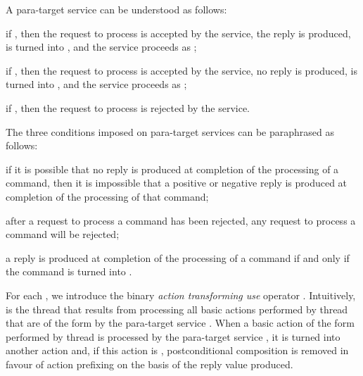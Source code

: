 \documentclass[fleqn]{llncs}
\begin{document}
A para-target service  can be understood as follows:
\begin{iteml}
\item
if , then the request to
process  is accepted by the service, the reply 
is produced,  is turned into , and the service proceeds as
;
\item
if , then the request to process  is
accepted by the service, no reply is produced,  is turned into
, and the service proceeds as ;
\item
if , then the request to process  is
rejected by the service.
\end{iteml}
The three conditions imposed on para-target services can be paraphrased
as follows:
\begin{iteml}
\item
if it is possible that no reply is produced at completion of the
processing of a command, then it is impossible that a positive or
negative reply is produced at completion of the processing of that
command;
\item
after a request to process a command has been rejected, any request to
process a command will be rejected;
\item
a reply is produced at completion of the processing of a command if and
only if the command is turned into .
\end{iteml}

For each , we introduce the binary
\emph{action transforming use} operator
.
Intuitively,  is the thread that results from processing
all basic actions performed by thread  that are of the form  by
the para-target service .
When a basic action of the form  performed by thread  is
processed by the para-target service , it is turned into another
action and, if this action is , postconditional composition is
removed in favour of action prefixing on the basis of the reply value
produced.
\end{document}

